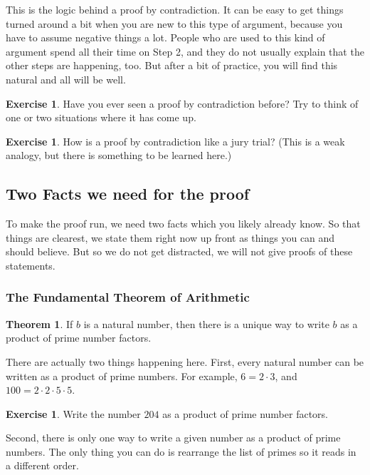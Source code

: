 \documentclass[12pt,letterpaper]{article}
\theoremstyle{definition}
\newtheorem{exercise}[question]{Exercise}
\newtheorem*{theorem}{Theorem}
\begin{document}
This is the logic behind a proof by contradiction.
It can be easy to get things turned around a bit when you are new to this type of argument, because you have to assume negative things a lot.
People who are used to this kind of argument spend all their time on Step 2, and they do not usually explain that the other steps are happening, too.
But after a bit of practice, you will find this natural and all will be well.

\begin{exercise}
Have you ever seen a proof by contradiction before?
Try to think of one or two situations where it has come up.
\end{exercise}

\begin{exercise}
How is a proof by contradiction like a jury trial?
(This is a weak analogy, but there is something to be learned here.)
\end{exercise}

\subsection*{Two Facts we need for the proof}
To make the proof run, we need two facts which you likely already know.
So that things are clearest, we state them right now up front as things you can and should believe.
But so we do not get distracted, we will not give proofs of these statements.

\subsubsection*{The Fundamental Theorem of Arithmetic}

\begin{theorem}
If $b$ is a natural number, then there is a unique way to write $b$ as a product of prime number factors.
\end{theorem}

There are actually two things happening here.
First, every natural number can be written as a product of prime numbers.
For example, $6=2\cdot 3$, and $100 = 2\cdot 2 \cdot 5 \cdot 5$.

\begin{exercise}
Write the number $204$ as a product of prime number factors.
\end{exercise}

Second, there is only one way to write a given number as a product of prime numbers.
The only thing you can do is rearrange the list of primes so it reads in a different order.
\end{document}
